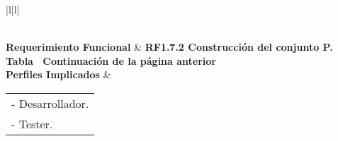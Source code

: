 \begin{longtable}{|l|l|}
\caption{Prueba unitaria RF1.7.2}
\label{PU_RF1_7_2}\\
\hline
\textbf{Requerimiento Funcional}                                                       & \textbf{RF1.7.2 Construcción del conjunto P.}                                                                                                                                                                                                                                                                                                                                                                                                                                                                                                                                                                                                                                                                                                                                                                                               \\ \hline
\endfirsthead
%
%
{{\bfseries Tabla \thetable\ Continuación de la página anterior}} \\
\endhead
%
\textbf{Perfiles Implicados}                                                           & \begin{tabular}[c]{@{}l@{}}- Desarrollador.\\ - Tester.\end{tabular}                                                                                                                                                                                                                                                                                                                                                                                                                                                                                                                                                                                                                                                                                                                                                                        \\ \hline

\end{longtable}
